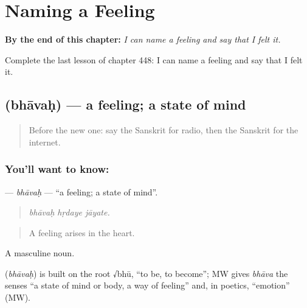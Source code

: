 
\chapter{Naming a Feeling}
\label{ch:sa-naming-a-feeling}

\begin{chapteropening}
\textbf{By the end of this chapter:} \emph{I can name a feeling and say that I felt it.}

Complete the last lesson of chapter 448: I can name a feeling and say that I felt it.
\end{chapteropening}

\section[\texorpdfstring{\sk{भावः} (bhāvaḥ)}{भावः (bhāvaḥ)}]{ (bhāvaḥ) — a feeling; a state of mind}

\label{lesson:SA-C448-bhavah}



\begin{quote}
Before the new one: say the Sanskrit for radio, then the Sanskrit for the internet.
\end{quote}

\subsection*{You'll want to know: }
\textbf{} — \emph{bhāvaḥ} — \textquotedblleft{}a feeling; a state of mind\textquotedblright{}.

\begin{quote}
  
\end{quote}

\begin{quote}
\emph{bhāvaḥ hṛdaye jāyate.}
\end{quote}

\begin{quote}
A feeling arises in the heart.
\end{quote}

A masculine noun.

\begin{cousinweb}
\textbf{} (\emph{bhāvaḥ}) is built on the root √bhū, \textquotedblleft{}to be, to become\textquotedblright{}; MW gives \emph{bhāva} the senses \textquotedblleft{}a state of mind or body, a way of feeling\textquotedblright{} and, in poetics, \textquotedblleft{}emotion\textquotedblright{} (MW).
\end{cousinweb}


